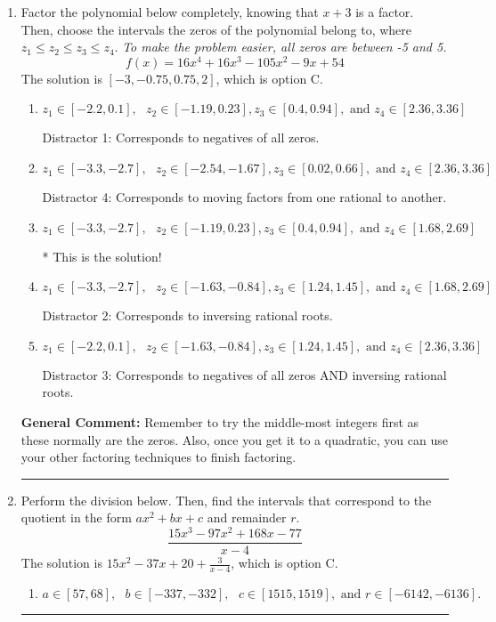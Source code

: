 \documentclass{extbook}[14pt]
\newcommand{\litem}[1]{\item #1

\rule{\textwidth}{0.4pt}}
\begin{document}
\begin{enumerate}\litem{
Factor the polynomial below completely, knowing that $x + 3$ is a factor. Then, choose the intervals the zeros of the polynomial belong to, where $z_1 \leq z_2 \leq z_3 \leq z_4$. \textit{To make the problem easier, all zeros are between -5 and 5.}
\[ f(x) = 16x^{4} +16 x^{3} -105 x^{2} -9 x + 54 \]The solution is \( [-3, -0.75, 0.75, 2] \), which is option C.\begin{enumerate}[label=\Alph*.]
\item \( z_1 \in [-2.2, 0.1], \text{   }  z_2 \in [-1.19, 0.23], z_3 \in [0.4, 0.94], \text{   and   } z_4 \in [2.36, 3.36] \)

 Distractor 1: Corresponds to negatives of all zeros.
\item \( z_1 \in [-3.3, -2.7], \text{   }  z_2 \in [-2.54, -1.67], z_3 \in [0.02, 0.66], \text{   and   } z_4 \in [2.36, 3.36] \)

 Distractor 4: Corresponds to moving factors from one rational to another.
\item \( z_1 \in [-3.3, -2.7], \text{   }  z_2 \in [-1.19, 0.23], z_3 \in [0.4, 0.94], \text{   and   } z_4 \in [1.68, 2.69] \)

* This is the solution!
\item \( z_1 \in [-3.3, -2.7], \text{   }  z_2 \in [-1.63, -0.84], z_3 \in [1.24, 1.45], \text{   and   } z_4 \in [1.68, 2.69] \)

 Distractor 2: Corresponds to inversing rational roots.
\item \( z_1 \in [-2.2, 0.1], \text{   }  z_2 \in [-1.63, -0.84], z_3 \in [1.24, 1.45], \text{   and   } z_4 \in [2.36, 3.36] \)

 Distractor 3: Corresponds to negatives of all zeros AND inversing rational roots.
\end{enumerate}

\textbf{General Comment:} Remember to try the middle-most integers first as these normally are the zeros. Also, once you get it to a quadratic, you can use your other factoring techniques to finish factoring.
}
\litem{
Perform the division below. Then, find the intervals that correspond to the quotient in the form $ax^2+bx+c$ and remainder $r$.
\[ \frac{15x^{3} -97 x^{2} +168 x -77}{x -4} \]The solution is \( 15x^{2} -37 x + 20 + \frac{3}{x -4} \), which is option C.\begin{enumerate}[label=\Alph*.]
\item \( a \in [57, 68], \text{   } b \in [-337, -332], \text{   } c \in [1515, 1519], \text{   and   } r \in [-6142, -6136]. \)


\end{enumerate}}
\end{enumerate}
\end{document}
